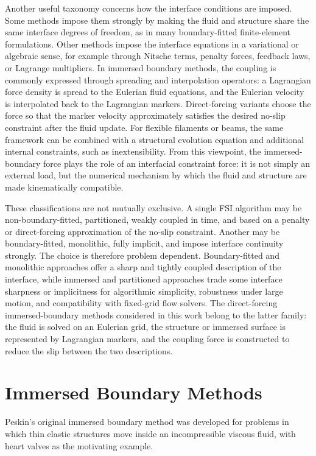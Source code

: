 Another useful taxonomy concerns how the interface conditions are imposed. Some
methods impose them strongly by making the fluid and structure share the same
interface degrees of freedom, as in many boundary-fitted finite-element
formulations. Other methods impose the interface equations in a variational or
algebraic sense, for example through Nitsche terms, penalty forces, feedback
laws, or Lagrange multipliers. In immersed boundary methods, the coupling is
commonly expressed through spreading and interpolation operators: a Lagrangian
force density is spread to the Eulerian fluid equations, and the Eulerian
velocity is interpolated back to the Lagrangian markers. Direct-forcing
variants choose the force so that the marker velocity approximately satisfies
the desired no-slip constraint after the fluid
update\cite{uhlmann_immersed_2005}. For flexible filaments or beams, the same
framework can be combined with a structural evolution equation and additional
internal constraints, such as inextensibility\cite{huang_simulation_2007}. From
this viewpoint, the immersed-boundary force plays the role of an interfacial
constraint force: it is not simply an external load, but the numerical
mechanism by which the fluid and structure are made kinematically compatible.

These classifications are not mutually exclusive. A single FSI algorithm may be
non-boundary-fitted, partitioned, weakly coupled in time, and based on a
penalty or direct-forcing approximation of the no-slip constraint. Another may
be boundary-fitted, monolithic, fully implicit, and impose interface continuity
strongly. The choice is therefore problem dependent. Boundary-fitted and
monolithic approaches offer a sharp and tightly coupled description of the
interface, while immersed and partitioned approaches trade some interface
sharpness or implicitness for algorithmic simplicity, robustness under large
motion, and compatibility with fixed-grid flow solvers. The direct-forcing
immersed-boundary methods considered in this work belong to the latter family:
the fluid is solved on an Eulerian grid, the structure or immersed surface is
represented by Lagrangian markers, and the coupling force is constructed to
reduce the slip between the two descriptions.

\section{Immersed Boundary Methods}

Peskin's original immersed boundary method was developed for problems in which
thin elastic structures move inside an incompressible viscous fluid, with heart
valves as the motivating example\cite{peskin_flow_1972,peskin_immersed_2002}.

